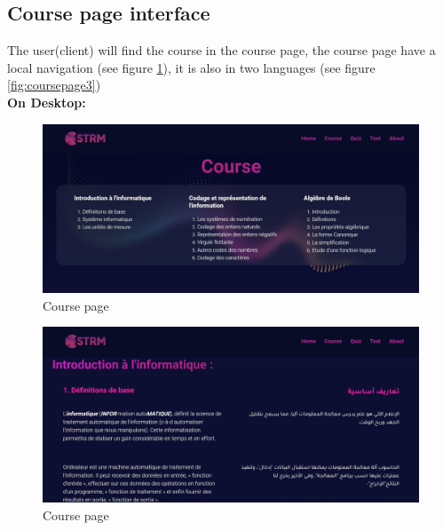 \newpage

\subsection{Course page interface}
The user(client) will find the course in the course page, the course page have a local navigation (see figure \ref{fig:coursepage1}), it is also in two languages (see figure \ref{fig:coursepage3})\\
\textbf{On Desktop:}
\begin{figure}[ht]
	\centering
	\label{}\includegraphics[scale=0.5]{img/3.jpg}                
	\caption{Course page} 
	\label{fig:coursepage1}
\end{figure} 


\begin{figure}[ht]
	\centering
	\label{}\includegraphics[scale=0.5]{img/4.jpg}                
	\caption{Course page} 
	\label{fig:coursepage2}
\end{figure} 

\newpage

